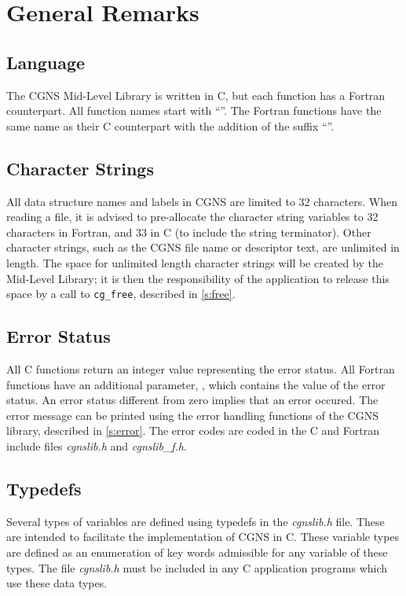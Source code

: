 \section{General Remarks}
\label{s:general}
\thispagestyle{plain}

\subsection{Language}

The CGNS Mid-Level Library is written in C, but each function has a
Fortran counterpart.
All function names start with ``''.
The Fortran functions have the same name as their C counterpart with the
addition of the suffix ``''.

\subsection{Character Strings}

All data structure names and labels in CGNS are limited to 32
characters.
When reading a file, it is advised to pre-allocate the
character string variables to 32 characters in Fortran, and 33
in C (to include the string terminator).
Other character strings, such as the CGNS file name or
descriptor text, are unlimited in length.
The space for unlimited length character strings will be created by the
Mid-Level Library; it is then the responsibility of the application to
release this space by a call to \texttt{cg\_free}, described in
\autoref{s:free}.

\subsection{Error Status}

All C functions return an integer value representing the error
status.
All Fortran functions have an additional parameter, ,
which contains the value of the error status.
An error status different from zero implies that an error occured.
The error message can be printed using the error
handling functions of the CGNS library, described in \autoref{s:error}.
The error codes are coded in the C and Fortran include files
\textit{cgnslib.h} and \textit{cgnslib\_f.h}.

\subsection{Typedefs}
\label{s:typedefs}

Several types of variables are defined using typedefs in the
\textit{cgnslib.h} file.
These are intended to facilitate the implementation of
CGNS in C.
These variable types are defined as an enumeration of key
words admissible for any variable of these types.
The file \textit{cgnslib.h} must be included in any C application
programs which use these data types.

